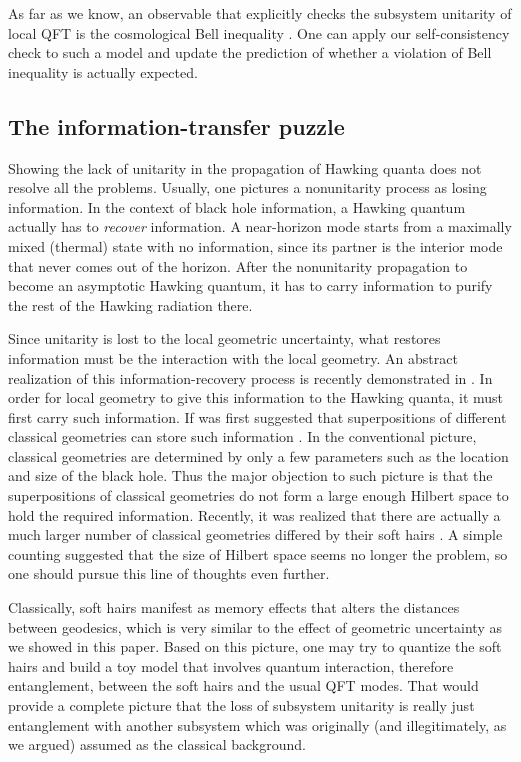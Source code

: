 \documentclass[aps,showpacs,onecolumn,floats,prd,superscriptaddress,nofootinbib]{revtex4-1}
\begin{document}
As far as we know, an observable that explicitly checks the subsystem unitarity of local QFT is the cosmological Bell inequality \cite{Mal15}. 
One can apply our self-consistency check to such a model and update the prediction of whether a violation of Bell inequality is actually expected.


\subsection{The information-transfer puzzle}

Showing the lack of unitarity in the propagation of Hawking quanta does not resolve all the problems. 
Usually, one pictures a nonunitarity process as losing information. 
In the context of black hole information, a Hawking quantum actually has to {\it recover} information. 
A near-horizon mode starts from a maximally mixed (thermal) state with no information, since its partner is the interior mode that never comes out of the horizon. 
After the nonunitarity propagation to become an asymptotic Hawking quantum, it has to carry information to purify the rest of the Hawking radiation there.

Since unitarity is lost to the local geometric uncertainty, what restores information must be the interaction with the local geometry. 
An abstract realization of this information-recovery process is recently demonstrated in \cite{OsuPag16}. 
In order for local geometry to give this information to the Hawking quanta, it must first carry such information.
If was first suggested that superpositions of different classical geometries can store such information \cite{NomVar12}.
In the conventional picture, classical geometries are determined by only a few parameters such as the location and size of the black hole.
Thus the major objection to such picture is that the superpositions of classical geometries do not form a large enough Hilbert space to hold the required information.
Recently, it was realized that there are actually a much larger number of classical geometries differed by their soft hairs \cite{HawPer16}.
A simple counting suggested that the size of Hilbert space seems no longer the problem, so one should pursue this line of thoughts even further.

Classically, soft hairs manifest as memory effects that alters the distances between geodesics, which is very similar to the effect of geometric uncertainty as we showed in this paper.
Based on this picture, one may try to quantize the soft hairs and build a toy model that involves quantum interaction, therefore entanglement, between the soft hairs and the usual QFT modes.
That would provide a complete picture that the loss of subsystem unitarity is really just entanglement with another subsystem which was originally (and illegitimately, as we argued) assumed as the classical background.
\end{document}
